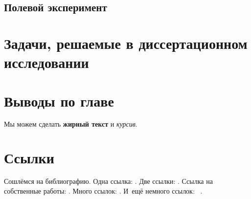 \subsection{Полевой эксперимент}\label{subsec:ch1/sec3/sub6}

\section{Задачи, решаемые в диссертационном исследовании}\label{sec:ch1/sec4}

\section{Выводы по главе}\label{sec:ch1/sec5}

















Мы можем сделать \textbf{жирный текст} и \textit{курсив}.

\section{Ссылки}\label{sec:ch1/sec2}

Сошлёмся на библиографию.
Одна ссылка: \cite[с.~54]{Sokolov}\cite[с.~36]{Gaidaenko}.
Две ссылки: \cite{Sokolov,Gaidaenko}.
Ссылка на собственные работы: \cite{vakbib1, confbib2}.
Много ссылок: %
\cite{Lermontov, Management, Borozda, Marketing, Constitution, FamilyCode,
    Gost.7.0.53, Razumovski, Lagkueva, Pokrovski, Methodology, Berestova,
    Kriger}%
%
.
И~ещё немного ссылок:~\cite{Article,Book,Booklet,Conference,Inbook,Incollection,Manual,Mastersthesis,
    Misc,Phdthesis,Proceedings,Techreport,Unpublished}
\cite{medvedev2006jelektronnye, CEAT:CEAT581, doi:10.1080/01932691.2010.513279,
    Gosele1999161,Li2007StressAnalysis, Shoji199895, test:eisner-sample,
    test:eisner-sample-shorted, AB_patent_Pomerantz_1968, iofis_patent1960}%
%
.

